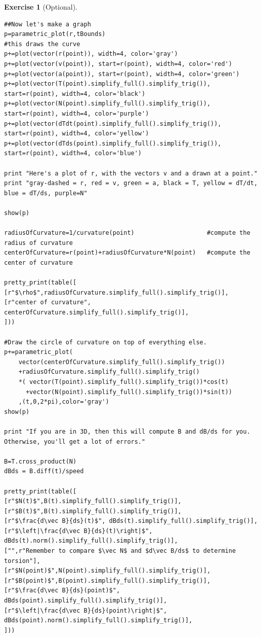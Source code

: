 \documentclass[10pt,]{book}
\theoremstyle{plain}
\theoremstyle{definition}
\theoremstyle{definition}
\theoremstyle{definition}
\theoremstyle{definition}
\newtheorem{exploration}[project]{Exercise}
\theoremstyle{definition}
\numberwithin{equation}{section}
\begin{document}
\begin{exploration}[Optional]
\begin{lstlisting}[style=sageinput]
##Now let's make a graph
p=parametric_plot(r,tBounds)                                        #this draws the curve
p+=plot(vector(r(point)), width=4, color='gray')
p+=plot(vector(v(point)), start=r(point), width=4, color='red')
p+=plot(vector(a(point)), start=r(point), width=4, color='green')
p+=plot(vector(T(point).simplify_full().simplify_trig()), start=r(point), width=4, color='black')
p+=plot(vector(N(point).simplify_full().simplify_trig()), start=r(point), width=4, color='purple')
p+=plot(vector(dTdt(point).simplify_full().simplify_trig()), start=r(point), width=4, color='yellow')
p+=plot(vector(dTds(point).simplify_full().simplify_trig()), start=r(point), width=4, color='blue')

print "Here's a plot of r, with the vectors v and a drawn at a point."
print "gray-dashed = r, red = v, green = a, black = T, yellow = dT/dt, blue = dT/ds, purple=N"

show(p)

radiusOfCurvature=1/curvature(point)                    #compute the radius of curvature
centerOfCurvature=r(point)+radiusOfCurvature*N(point)   #compute the center of curvature

pretty_print(table([
[r"$\rho$",radiusOfCurvature.simplify_full().simplify_trig()],
[r"center of curvature", centerOfCurvature.simplify_full().simplify_trig()],
]))

#Draw the circle of curvature on top of everything else.
p+=parametric_plot(
    vector(centerOfCurvature.simplify_full().simplify_trig())
    +radiusOfCurvature.simplify_full().simplify_trig()
    *( vector(T(point).simplify_full().simplify_trig())*cos(t)
      +vector(N(point).simplify_full().simplify_trig())*sin(t))
    ,(t,0,2*pi),color='gray')
show(p)

print "If you are in 3D, then this will compute B and dB/ds for you. Otherwise, you'll get a lot of errors."

B=T.cross_product(N)
dBds = B.diff(t)/speed

pretty_print(table([
[r"$N(t)$",B(t).simplify_full().simplify_trig()],
[r"$B(t)$",B(t).simplify_full().simplify_trig()],
[r"$\frac{d\vec B}{ds}(t)$", dBds(t).simplify_full().simplify_trig()],
[r"$\left|\frac{d\vec B}{ds}(t)\right|$", dBds(t).norm().simplify_full().simplify_trig()],
["",r"Remember to compare $\vec N$ and $d\vec B/ds$ to determine torsion"],
[r"$N(point)$",N(point).simplify_full().simplify_trig()],
[r"$B(point)$",B(point).simplify_full().simplify_trig()],
[r"$\frac{d\vec B}{ds}(point)$", dBds(point).simplify_full().simplify_trig()],
[r"$\left|\frac{d\vec B}{ds}(point)\right|$", dBds(point).norm().simplify_full().simplify_trig()],
]))
\end{lstlisting}
\end{exploration}
\end{document}
